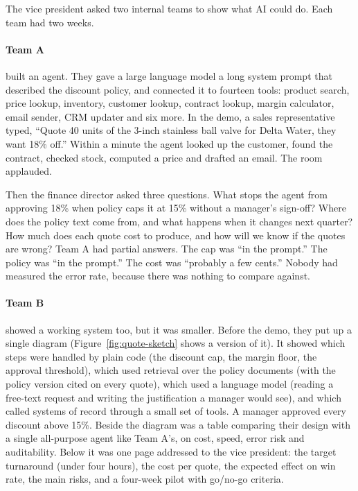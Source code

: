 The vice president asked two internal teams to show what AI could do. Each team had two weeks.

\paragraph{Team A} built an agent. They gave a large language model a long system prompt that described the discount policy, and connected it to fourteen tools: product search, price lookup, inventory, customer lookup, contract lookup, margin calculator, email sender, CRM updater and six more. In the demo, a sales representative typed, ``Quote 40 units of the 3-inch stainless ball valve for Delta Water, they want 18\% off.'' Within a minute the agent looked up the customer, found the contract, checked stock, computed a price and drafted an email. The room applauded.

Then the finance director asked three questions. What stops the agent from approving 18\% when policy caps it at 15\% without a manager's sign-off? Where does the policy text come from, and what happens when it changes next quarter? How much does each quote cost to produce, and how will we know if the quotes are wrong? Team A had partial answers. The cap was ``in the prompt.'' The policy was ``in the prompt.'' The cost was ``probably a few cents.'' Nobody had measured the error rate, because there was nothing to compare against.

\paragraph{Team B} showed a working system too, but it was smaller. Before the demo, they put up a single diagram (Figure~\ref{fig:quote-sketch} shows a version of it). It showed which steps were handled by plain code (the discount cap, the margin floor, the approval threshold), which used retrieval over the policy documents (with the policy version cited on every quote), which used a language model (reading a free-text request and writing the justification a manager would see), and which called systems of record through a small set of tools. A manager approved every discount above 15\%. Beside the diagram was a table comparing their design with a single all-purpose agent like Team A's, on cost, speed, error risk and auditability. Below it was one page addressed to the vice president: the target turnaround (under four hours), the cost per quote, the expected effect on win rate, the main risks, and a four-week pilot with go/no-go criteria.

